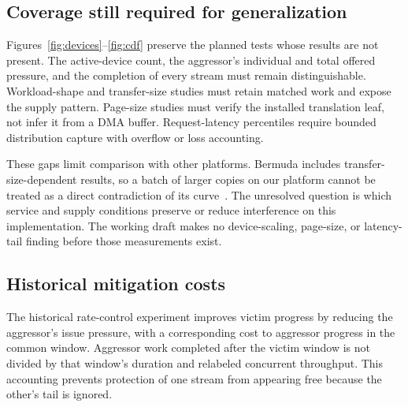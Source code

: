 \subsection{Coverage still required for generalization}
Figures~\ref{fig:devices}--\ref{fig:cdf} preserve the planned tests whose results are not present. The active-device count, the aggressor's individual and total offered pressure, and the completion of every stream must remain distinguishable. Workload-shape and transfer-size studies must retain matched work and expose the supply pattern. Page-size studies must verify the installed translation leaf, not infer it from a DMA buffer. Request-latency percentiles require bounded distribution capture with overflow or loss accounting.

These gaps limit comparison with other platforms. Bermuda includes transfer-size-dependent results, so a batch of larger copies on our platform cannot be treated as a direct contradiction of its curve~\cite{bermuda2025}. The unresolved question is which service and supply conditions preserve or reduce interference on this implementation. The working draft makes no device-scaling, page-size, or latency-tail finding before those measurements exist.

\subsection{Historical mitigation costs}
The historical rate-control experiment improves victim progress by reducing the aggressor's issue pressure, with a corresponding cost to aggressor progress in the common window. Aggressor work completed after the victim window is not divided by that window's duration and relabeled concurrent throughput. This accounting prevents protection of one stream from appearing free because the other's tail is ignored.

